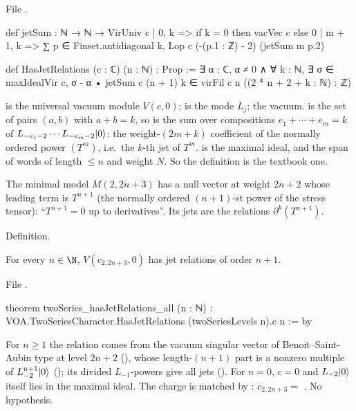 \noindent File .
\begin{leancode}
def jetSum : ℕ → ℕ → VirUniv c
  | 0, k => if k = 0 then vacVec c else 0
  | m + 1, k => ∑ p ∈ Finset.antidiagonal k, Lop c (-(p.1 : ℤ) - 2) (jetSum m p.2)

def HasJetRelations (c : ℂ) (n : ℕ) : Prop :=
  ∃ α : ℂ, α ≠ 0 ∧ ∀ k : ℕ, ∃ σ ∈ maxIdealVir c,
    σ - α • jetSum c (n + 1) k ∈ virFil c n ((2 * n + 2 + k : ℕ) : ℤ)
\end{leancode}

\begin{dictionary}
 is the universal vacuum module $V(c,0)$;  is the mode $L_j$;  the vacuum.
 is the set of pairs $(a,b)$ with $a+b=k$, so  is the sum over
compositions $e_1+\cdots+e_m=k$ of $L_{-e_1-2}\cdots L_{-e_m-2}|0\rangle$: the weight-$(2m+k)$ coefficient of the
normally ordered power $(T^m)$, i.e.\ the $k$-th jet of $T^m$.  is the maximal ideal, and
 the span of words of length $\le n$ and weight $N$. So the definition is the textbook one.
\end{dictionary}

\begin{physics}
The minimal model $M(2,2n+3)$ has a null vector at weight $2n+2$ whose leading term is $T^{n+1}$ (the normally ordered
$(n+1)$-st power of the stress tensor): ``$T^{n+1}=0$ up to derivatives''. Its jets are the relations $\partial^k(T^{n+1})$.
\end{physics}

\begin{status}
Definition.
\end{status}

\begin{theorem}\label{l29:thm:jetrel}
For every $n\in\N$, $V(c_{2,2n+3},0)$ has jet relations of order $n+1$.
\end{theorem}

\noindent File .
\begin{leancode}
theorem twoSeries_hasJetRelations_all (n : ℕ) :
    VOA.TwoSeriesCharacter.HasJetRelations (twoSeriesLevels n).c n := by
\end{leancode}

\begin{dictionary}
For $n\ge1$ the relation comes from the vacuum singular vector of Benoit--Saint-Aubin type at level $2n+2$
(), whose length-$(n+1)$ part is a nonzero multiple of $L_{-2}^{n+1}|0\rangle$
(); its divided $L_{-1}$-powers give all jets (). For $n=0$,
$c=0$ and $L_{-2}|0\rangle$ itself lies in the maximal ideal. The charge is matched by
: $c_{2,2n+3}=$ . No hypothesis.
\end{dictionary}

